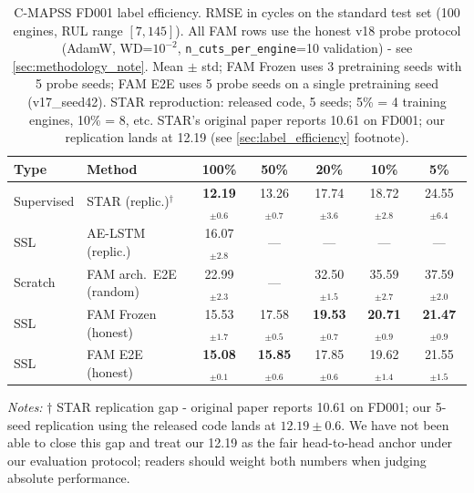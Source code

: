 \documentclass{article}
\begin{document}
\begin{table}[t]
\centering
\caption{C-MAPSS FD001 label efficiency. RMSE in cycles on the standard test set (100 engines, RUL range $[7, 145]$). All FAM rows use the honest v18 probe protocol (AdamW, WD=$10^{-2}$, \texttt{n\_cuts\_per\_engine}=10 validation) - see \cref{sec:methodology_note}. Mean $\pm$ std; FAM Frozen uses 3 pretraining seeds with 5 probe seeds; FAM E2E uses 5 probe seeds on a single pretraining seed (v17\_seed42). STAR reproduction: released code, 5 seeds; 5\% = 4 training engines, 10\% = 8, etc. STAR's original paper reports 10.61 on FD001; our replication lands at 12.19 (see \cref{sec:label_efficiency} footnote).}
\label{tab:main_results}
\small
\begin{tabular}{@{}llccccc@{}}
\toprule
Type & Method & 100\% & 50\% & 20\% & 10\% & 5\% \\
\midrule
Supervised & STAR (replic.)$^\dagger$ & \textbf{12.19}$_{\pm0.6}$ & 13.26$_{\pm0.7}$ & 17.74$_{\pm3.6}$ & 18.72$_{\pm2.8}$ & 24.55$_{\pm6.4}$ \\
SSL & AE-LSTM (replic.) & 16.07$_{\pm2.8}$ & --- & --- & --- & --- \\
\midrule
Scratch & FAM arch.\ E2E (random) & 22.99$_{\pm2.3}$ & --- & 32.50$_{\pm1.5}$ & 35.59$_{\pm2.7}$ & 37.59$_{\pm2.0}$ \\
SSL & FAM Frozen (honest) & 15.53$_{\pm1.7}$ & 17.58$_{\pm0.5}$ & \textbf{19.53}$_{\pm0.7}$ & \textbf{20.71}$_{\pm0.9}$ & \textbf{21.47}$_{\pm0.9}$ \\
SSL & FAM E2E (honest) & \textbf{15.08}$_{\pm0.1}$ & \textbf{15.85}$_{\pm0.6}$ & 17.85$_{\pm0.6}$ & 19.62$_{\pm1.4}$ & 21.55$_{\pm1.5}$ \\
\bottomrule
\end{tabular}

\vspace{2pt}
{\footnotesize\raggedright\textit{Notes:} $\dagger$ STAR replication gap - original paper reports 10.61 on FD001; our 5-seed replication using the released code lands at $12.19 \pm 0.6$. We have not been able to close this gap and treat our 12.19 as the fair head-to-head anchor under our evaluation protocol; readers should weight both numbers when judging absolute performance. \par}
\end{table}
\end{document}
